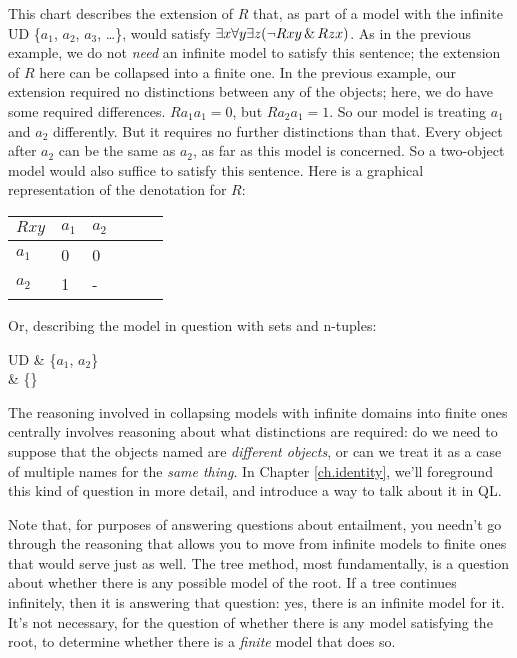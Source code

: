 This chart describes the extension of $R$ that, as part of a model with the infinite UD \{$a_{1}$, $a_{2}$, $a_{3}$, \ldots\}, would satisfy $\exists x \forall y \exists z (\neg Rxy \,\&\, Rzx)$. As in the previous example, we do not \emph{need} an infinite model to satisfy this sentence; the extension of $R$ here can be collapsed into a finite one. In the previous example, our extension required no distinctions between any of the objects; here, we do have some required differences. $Ra_{1}a_{1}=0$, but $Ra_{2}a_{1}=1$. So our model is treating $a_{1}$ and $a_{2}$ differently. But it requires no further distinctions than that. Every object after $a_{2}$ can be the same as $a_{2}$, as far as this model is concerned.  So a two-object model would also suffice to satisfy this sentence. Here is a graphical representation of the denotation for $R$:

\begin{table}[h!]
\centering
\begin{tabular}{l|lllll}
$Rxy$   & $a_{1}$ & $a_{2}$ \\ \hline
$a_{1}$   & 0 & 0   \\
$a_{2}$   & 1 & - \\
\end{tabular}
\end{table}

Or, describing the model in question with sets and n-tuples:


\begin{partialmodel}
	UD & \{$a_{1}$, $a_{2}$\}\\
	 & \{\}
\end{partialmodel}


The reasoning involved in collapsing models with infinite domains into finite ones centrally involves reasoning about what distinctions are required: do we need to suppose that the objects named are \emph{different objects}, or can we treat it as a case of multiple names for the \emph{same thing}. In Chapter \ref{ch.identity}, we'll foreground this kind of question in more detail, and introduce a way to talk about it in QL.

Note that, for purposes of answering questions about entailment, you needn't go through the reasoning that allows you to move from infinite models to finite ones that would serve just as well. The tree method, most fundamentally, is a question about whether there is any possible model of the root. If a tree continues infinitely, then it is answering that question: yes, there is an infinite model for it. It's not necessary, for the question of whether there is any model satisfying the root, to determine whether there is a \emph{finite} model that does so.


